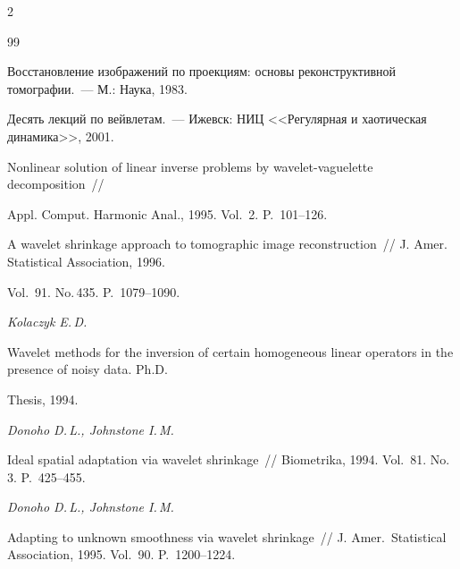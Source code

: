 \begin{multicols}{2}
{{\begin{thebibliography}{99}




Восстановление изображений по проекциям: основы реконструктивной томографии.~--- М.: Наука, 1983.









Десять лекций по вейвлетам.~--- Ижевск: НИЦ <<Регулярная и хаотическая динамика>>, 2001.









Nonlinear solution of linear inverse problems by wavelet-vaguelette decomposition~// 


Appl. Comput. Harmonic Anal., 1995. Vol.~2. P.~101--126.









A wavelet shrinkage approach to tomographic image reconstruction~// J. Amer. Statistical Association, 1996. 


Vol.~91. No.\,435. P.~1079--1090.







\textit{Kolaczyk E.\,D.} 


Wavelet methods for the inversion of certain homogeneous linear operators in the presence of noisy data.  Ph.D.\ 


Thesis, 1994.







\textit{Donoho D.\,L., Johnstone I.\,M.} 


Ideal spatial adaptation via wavelet shrinkage~// Biometrika, 1994. Vol.~81. No.\,3. P.~425--455.







\textit{Donoho D.\,L., Johnstone I.\,M.} 


Adapting to unknown smoothness via wavelet shrinkage~// J. Amer.\ Statistical Association, 1995. Vol.~90. P.~1200--1224.






\end{thebibliography}}}
\end{multicols}
